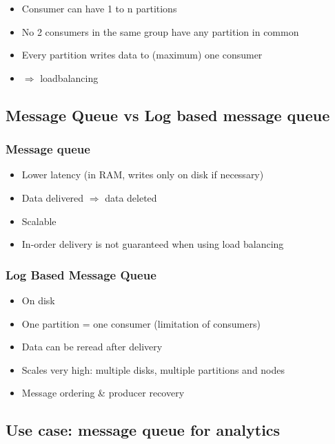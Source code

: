 \documentclass{article}
\begin{document}
\begin{itemize}
    \item Consumer can have 1 to n partitions
    \item No 2 consumers in the same group have any partition in common
    \item Every partition writes data to (maximum) one consumer
    \item $\Rightarrow$ loadbalancing 
\end{itemize}

\subsection{Message Queue vs Log based message queue}

\subsubsection{Message queue}

\begin{itemize}
    \item Lower latency (in RAM, writes only on disk if necessary)
    \item Data delivered $\Rightarrow$ data deleted
    \item Scalable
    \item In-order delivery is not guaranteed when using load balancing
\end{itemize}

\subsubsection{Log Based Message Queue}

\begin{itemize}
    \item On disk
    \item One partition = one consumer (limitation of consumers)
    \item Data can be reread after delivery
    \item Scales very high: multiple disks, multiple partitions and nodes
    \item Message ordering \& producer recovery
\end{itemize}

\subsection{Use case: message queue for analytics}
\end{document}
